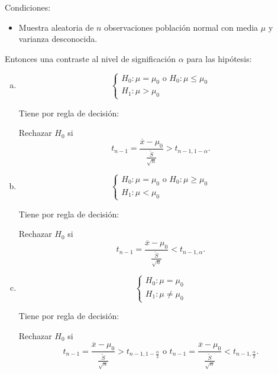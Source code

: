 \documentclass[12pt]{report}
\begin{document}
Condiciones:
\begin{itemize}
        \item  Muestra aleatoria de $n$ observaciones población normal
        con media $\mu$ y varianza desconocida.
\end{itemize}
    Entonces una contraste al nivel de significación $\alpha$ para las
    hipótesis:
\begin{enumerate}[a)]
\item $$\left\{\begin{array}{l}
    H_{0}:\mu=\mu_{0} \mbox{ o } H_{0}:\mu\leq \mu_{0}\\
    H_{1}:\mu>\mu_{0}
    \end{array}\right.$$


    Tiene por regla de decisión:

    Rechazar $H_{0}$ si
    $$t_{n-1}=
    \frac{\overline{x}-\mu_{0}}{\frac{\tilde{S}}{\sqrt{n}}}>t_{n-1,1-\alpha}.$$

\item   $$\left\{\begin{array}{l}
    H_{0}:\mu=\mu_{0} \mbox{ o } H_{0}:\mu\geq \mu_{0}\\
    H_{1}:\mu<\mu_{0}
    \end{array}\right.$$


    Tiene por regla de decisión:

    Rechazar $H_{0}$ si
    $$t_{n-1}=
    \frac{\overline{x}-\mu_{0}}{\frac{\tilde{S}}{\sqrt{n}}}<t_{n-1,\alpha}.$$

\item $$\left\{\begin{array}{l}
    H_{0}:\mu=\mu_{0} \\
    H_{1}:\mu\not=\mu_{0}
    \end{array}\right.$$


    Tiene por regla de decisión:

    Rechazar $H_{0}$ si  
    $$t_{n-1}=
    \frac{\overline{x}-\mu_{0}}
    {\frac{\tilde{S}}{\sqrt{n}}}>t_{n-1,1-\frac{\alpha}{2}} \mbox{ o } t_{n-1}=
    \frac{\overline{x}-\mu_{0}}
    {\frac{\tilde{S}}{\sqrt{n}}}<t_{n-1,\frac{\alpha}{2}}.$$
\end{enumerate}
\end{document}
